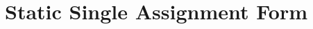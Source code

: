 \documentclass[acmsmall,screen,review]{acmart}
\newcommand{\ms}[1]{\ensuremath{\mathsf{#1}}}
\newcommand{\isotopessa}{\(\lambda_{\ms{SSA}}\)}
\begin{document}
\section{Static Single Assignment Form}


\end{document}
